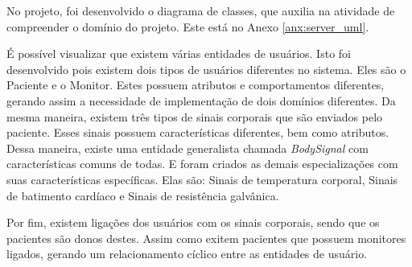 No projeto, foi desenvolvido o diagrama de classes, que auxilia na atividade de compreender
o domínio do projeto. Este está no Anexo \ref{anx:server_uml}.

É possível visualizar que existem várias entidades de usuários. Isto foi desenvolvido pois
existem dois tipos de usuários diferentes no sistema. Eles são o Paciente e o Monitor. Estes
possuem atributos e comportamentos diferentes, gerando assim a necessidade de implementação
de dois domínios diferentes.  Da mesma maneira, existem três tipos de sinais corporais que são enviados pelo paciente.
Esses sinais possuem características diferentes, bem como atributos. Dessa maneira, existe
uma entidade generalista chamada \textit{BodySignal} com características comuns de todas. E
foram criados as demais especializações com suas características  específicas. Elas são:
Sinais de temperatura corporal, Sinais de batimento cardíaco e Sinais de resistência galvânica.

Por fim, existem ligações dos usuários com os sinais corporais, sendo que os pacientes
são donos destes. Assim como exitem pacientes que possuem monitores ligados,
gerando um relacionamento cíclico entre as entidades de usuário.
